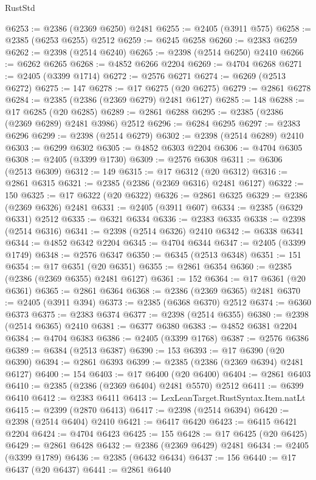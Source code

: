 \begin{lexlean}{RustStd}
\begin{coremodule}
@6253 := @2386 (@2369 @6250) @2481
@6255 := @2405 (@3911 @575)
@6258 := @2385 (@6253 @6255) @2512
@6259 := @6245 @6258
@6260 := @2383 @6259
@6262 := @2398 (@2514 @6240)
@6265 := @2398 (@2514 @6250) @2410
@6266 := @6262 @6265
@6268 := @4852 @6266 @2204
@6269 := @4704 @6268
@6271 := @2405 (@3399 @1714)
@6272 := @2576 @6271
@6274 := @6269 (@2513 @6272)
@6275 := 147
@6278 := @17 @6275 (@20 @6275)
@6279 := @2861 @6278
@6284 := @2385 (@2386 (@2369 @6279) @2481 @6127)
@6285 := 148
@6288 := @17 @6285 (@20 @6285)
@6289 := @2861 @6288
@6295 := @2385 (@2386 (@2369 @6289) @2481 @3986) @2512
@6296 := @6284 @6295
@6297 := @2383 @6296
@6299 := @2398 (@2514 @6279)
@6302 := @2398 (@2514 @6289) @2410
@6303 := @6299 @6302
@6305 := @4852 @6303 @2204
@6306 := @4704 @6305
@6308 := @2405 (@3399 @1730)
@6309 := @2576 @6308
@6311 := @6306 (@2513 @6309)
@6312 := 149
@6315 := @17 @6312 (@20 @6312)
@6316 := @2861 @6315
@6321 := @2385 (@2386 (@2369 @6316) @2481 @6127)
@6322 := 150
@6325 := @17 @6322 (@20 @6322)
@6326 := @2861 @6325
@6329 := @2386 (@2369 @6326) @2481
@6331 := @2405 (@3911 @607)
@6334 := @2385 (@6329 @6331) @2512
@6335 := @6321 @6334
@6336 := @2383 @6335
@6338 := @2398 (@2514 @6316)
@6341 := @2398 (@2514 @6326) @2410
@6342 := @6338 @6341
@6344 := @4852 @6342 @2204
@6345 := @4704 @6344
@6347 := @2405 (@3399 @1749)
@6348 := @2576 @6347
@6350 := @6345 (@2513 @6348)
@6351 := 151
@6354 := @17 @6351 (@20 @6351)
@6355 := @2861 @6354
@6360 := @2385 (@2386 (@2369 @6355) @2481 @6127)
@6361 := 152
@6364 := @17 @6361 (@20 @6361)
@6365 := @2861 @6364
@6368 := @2386 (@2369 @6365) @2481
@6370 := @2405 (@3911 @394)
@6373 := @2385 (@6368 @6370) @2512
@6374 := @6360 @6373
@6375 := @2383 @6374
@6377 := @2398 (@2514 @6355)
@6380 := @2398 (@2514 @6365) @2410
@6381 := @6377 @6380
@6383 := @4852 @6381 @2204
@6384 := @4704 @6383
@6386 := @2405 (@3399 @1768)
@6387 := @2576 @6386
@6389 := @6384 (@2513 @6387)
@6390 := 153
@6393 := @17 @6390 (@20 @6390)
@6394 := @2861 @6393
@6399 := @2385 (@2386 (@2369 @6394) @2481 @6127)
@6400 := 154
@6403 := @17 @6400 (@20 @6400)
@6404 := @2861 @6403
@6410 := @2385 (@2386 (@2369 @6404) @2481 @5570) @2512
@6411 := @6399 @6410
@6412 := @2383 @6411
@6413 := LexLeanTarget.RustSyntax.Item.natLt
@6415 := @2399 (@2870 @6413)
@6417 := @2398 (@2514 @6394)
@6420 := @2398 (@2514 @6404) @2410
@6421 := @6417 @6420
@6423 := @6415 @6421 @2204
@6424 := @4704 @6423
@6425 := 155
@6428 := @17 @6425 (@20 @6425)
@6429 := @2861 @6428
@6432 := @2386 (@2369 @6429) @2481
@6434 := @2405 (@3399 @1789)
@6436 := @2385 (@6432 @6434)
@6437 := 156
@6440 := @17 @6437 (@20 @6437)
@6441 := @2861 @6440

\end{coremodule}
\end{lexlean}
